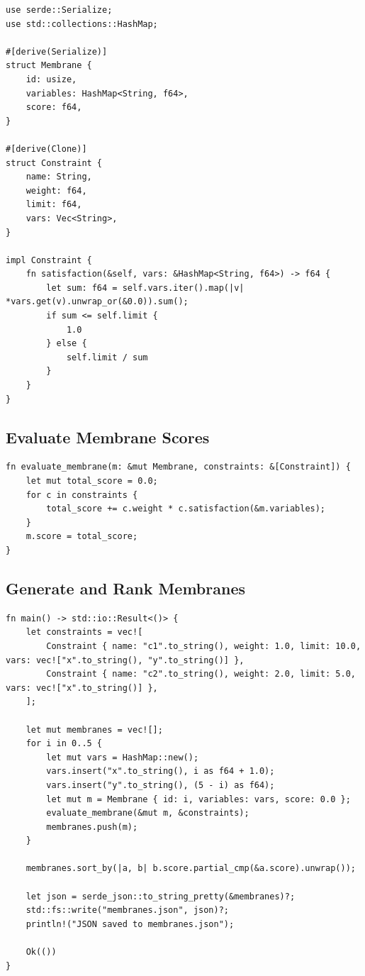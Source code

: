 \documentclass[12pt]{article}
\begin{document}
\begin{lstlisting}[style=ruststyle]
use serde::Serialize;
use std::collections::HashMap;

#[derive(Serialize)]
struct Membrane {
    id: usize,
    variables: HashMap<String, f64>,
    score: f64,
}

#[derive(Clone)]
struct Constraint {
    name: String,
    weight: f64,
    limit: f64,
    vars: Vec<String>,
}

impl Constraint {
    fn satisfaction(&self, vars: &HashMap<String, f64>) -> f64 {
        let sum: f64 = self.vars.iter().map(|v| *vars.get(v).unwrap_or(&0.0)).sum();
        if sum <= self.limit {
            1.0
        } else {
            self.limit / sum
        }
    }
}
\end{lstlisting}

\subsection{Evaluate Membrane Scores}

\begin{lstlisting}[style=ruststyle]
fn evaluate_membrane(m: &mut Membrane, constraints: &[Constraint]) {
    let mut total_score = 0.0;
    for c in constraints {
        total_score += c.weight * c.satisfaction(&m.variables);
    }
    m.score = total_score;
}
\end{lstlisting}

\subsection{Generate and Rank Membranes}

\begin{lstlisting}[style=ruststyle]
fn main() -> std::io::Result<()> {
    let constraints = vec![
        Constraint { name: "c1".to_string(), weight: 1.0, limit: 10.0, vars: vec!["x".to_string(), "y".to_string()] },
        Constraint { name: "c2".to_string(), weight: 2.0, limit: 5.0, vars: vec!["x".to_string()] },
    ];

    let mut membranes = vec![];
    for i in 0..5 {
        let mut vars = HashMap::new();
        vars.insert("x".to_string(), i as f64 + 1.0);
        vars.insert("y".to_string(), (5 - i) as f64);
        let mut m = Membrane { id: i, variables: vars, score: 0.0 };
        evaluate_membrane(&mut m, &constraints);
        membranes.push(m);
    }

    membranes.sort_by(|a, b| b.score.partial_cmp(&a.score).unwrap());

    let json = serde_json::to_string_pretty(&membranes)?;
    std::fs::write("membranes.json", json)?;
    println!("JSON saved to membranes.json");

    Ok(())
}
\end{lstlisting}
\end{document}
